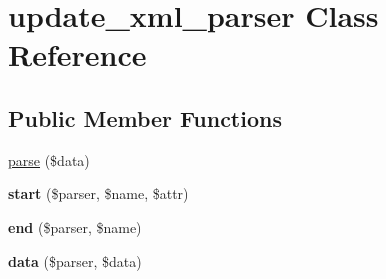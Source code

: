 \hypertarget{classupdate__xml__parser}{
\section{update\_\-xml\_\-parser Class Reference}
\label{classupdate__xml__parser}
}
\subsection*{Public Member Functions}
\begin{CompactItemize}
\item 
\hyperlink{classupdate__xml__parser_cac986d9576e4ce77eca93abec17ed15}{parse} (\$data)
\item 
\hypertarget{classupdate__xml__parser_324ddd700720f2d3626de81af8e5e8f0}{
\textbf{start} (\$parser, \$name, \$attr)}
\label{classupdate__xml__parser_324ddd700720f2d3626de81af8e5e8f0}

\item 
\hypertarget{classupdate__xml__parser_4e7a9f580306f33742c2de28af661cb2}{
\textbf{end} (\$parser, \$name)}
\label{classupdate__xml__parser_4e7a9f580306f33742c2de28af661cb2}

\item 
\hypertarget{classupdate__xml__parser_e0289987441f79eee7be12dee5556e47}{
\textbf{data} (\$parser, \$data)}
\label{classupdate__xml__parser_e0289987441f79eee7be12dee5556e47}

\end{CompactItemize}
